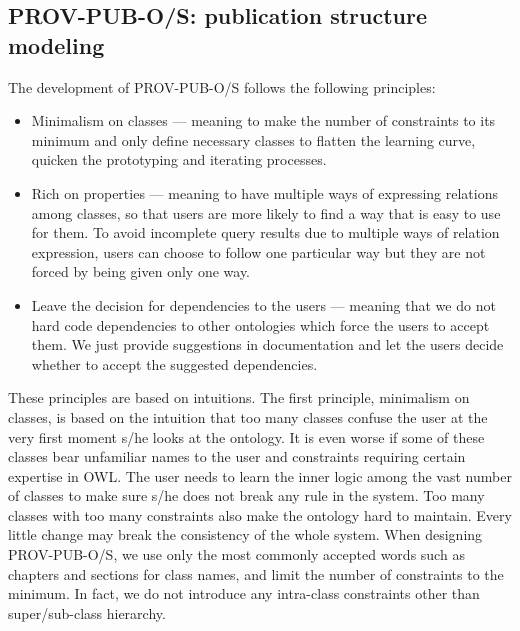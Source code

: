 
\subsection{PROV-PUB-O/S: publication structure modeling}
\label{subsec:structure}

The development of PROV-PUB-O/S follows the following principles:
\begin{itemize}
	\item Minimalism on classes --- meaning to make the number of constraints to its minimum and only define necessary classes to flatten the learning curve, quicken the prototyping and iterating processes.
	\item Rich on properties --- meaning to have multiple ways of expressing relations among classes, so that users are more likely to find a way that is easy to use for them. To avoid incomplete query results due to multiple ways of relation expression, users can choose to follow one particular way but they are not forced by being given only one way.
	\item Leave the decision for dependencies to the users --- meaning that we do not hard code dependencies to other ontologies which force the users to accept them. We just provide suggestions in documentation and let the users decide whether to accept the suggested dependencies.
\end{itemize}

These principles are based on intuitions. The first principle, minimalism on classes, is based on the intuition that too many classes confuse the user at the very first moment s/he looks at the ontology. It is even worse if some of these classes bear unfamiliar names to the user and constraints requiring certain expertise in OWL. The user needs to learn the inner logic among the vast number of classes to make sure s/he does not break any rule in the system. Too many classes with too many constraints also make the ontology hard to maintain. Every little change may break the consistency of the whole system. When designing PROV-PUB-O/S, we use only the most commonly accepted words such as chapters and sections for class names, and limit the number of constraints to the minimum. In fact, we do not introduce any intra-class constraints other than super/sub-class hierarchy.

